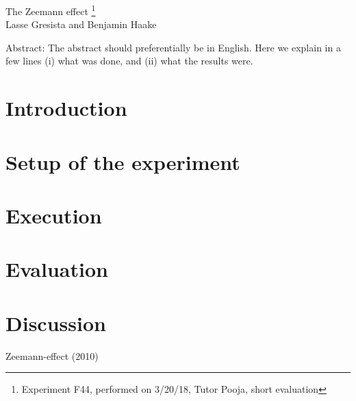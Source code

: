 \documentclass[12pt]{article}
\begin{document}
\thispagestyle{empty}     %
\null
\vspace{40mm}
\begin{center}
{%
\Large  The Zeemann effect
\footnote{\noindent Experiment F44, performed on 3/20/18, Tutor Pooja, short evaluation}}\\[15mm]
Lasse Gresista and Benjamin Haake

\vspace{25mm}

\parbox{0.9\textwidth}{   %
Abstract:    
\small The abstract should preferentially be in English. Here we explain in a
few lines (i) what was done, and (ii) what the results were.
}
\end{center}

\vfill
\vspace{20mm}

\newpage  
\null\thispagestyle{empty}

\newpage
{}

\section{Introduction}
\section{Setup of the experiment}
\section{Execution}
\section{Evaluation}
\section{Discussion}

\newpage
\begin{thebibliography}{00}   %

 Zeemann-effect (2010)

\end{thebibliography}
\end{document}
